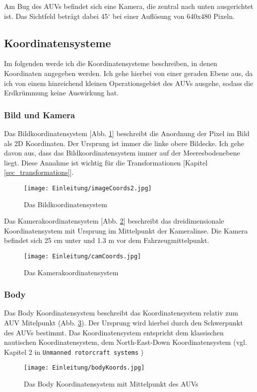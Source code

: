 Am Bug des AUVs befindet sich eine Kamera, die zentral nach unten ausgerichtet ist. Das Sichtfeld beträgt dabei 45$^\circ$ bei einer Auflösung von 640x480 Pixeln.
\subsection{Koordinatensysteme}

Im folgenden werde ich die Koordinatensysteme beschreiben, in denen Koordinaten angegeben werden. Ich gehe hierbei von einer geraden Ebene aus, da ich von einem hinreichend kleinen Operationsgebiet des AUVs ausgehe, sodass die Erdkrümmung keine Auswirkung hat.
\subsubsection{Bild und Kamera}
\label{sec_img_cam_coords}
Das Bildkoordinatensystem [Abb. \ref{imageKoords}] beschreibt die Anordnung der Pixel im Bild als 2D Koordinaten. Der Ursprung ist immer die linke obere Bildecke. Ich gehe davon aus, dass das Bildkoordinatensystem immer auf der Meeresbodenebene liegt. Diese Annahme ist wichtig für die Transformationen [Kapitel \ref{sec_transformations}].
\begin{figure}[H]
	\centering
	\texttt{[image: Einleitung/imageCoords2.jpg]}
	\caption{Das Bildkoordinatensystem}
	\label{imageKoords}
\end{figure}
Das Kamerakoordinatensystem [Abb. \ref{CamKoords}] beschreibt das dreidimensionale Koordinatensystem mit Ursprung im Mittelpunkt der Kameralinse. Die Kamera befindet sich 25 cm unter und 1.3 m vor dem Fahrzeugmittelpunkt.
\begin{figure}[H]
	\centering
	\texttt{[image: Einleitung/camCoords.jpg]}
	\caption{Das Kamerakoordinatensystem}
	\label{CamKoords}
\end{figure}

\subsubsection{Body}
Das Body Koordinatensystem beschreibt das Koordinatensystem relativ zum AUV Mitelpunkt (Abb. \ref{Abb. 1}).
Der Ursprung wird hierbei durch den Schwerpunkt des AUVs bestimmt.
Das Koordinatensystem entspricht dem klassischen nautischen Koordinatensystem, dem North-East-Down Koordinatensystem (vgl. Kapitel 2 in \texttt{Unmanned rotorcraft systems} \cite{cai2011unmanned})
\begin{figure}[H]
	\centering
	\texttt{[image: Einleitung/bodyKoords.jpg]}
	\caption{Das Body Koordinatensystem mit Mittelpunkt des AUVs}
	\label{Abb. 1}
\end{figure}

